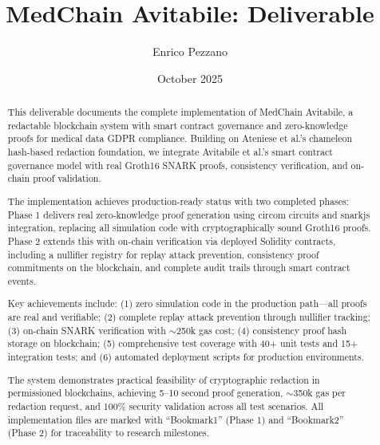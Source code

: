 \documentclass[11pt,a4paper]{article}
\title{MedChain Avitabile: Deliverable}
\author{Enrico Pezzano}
\date{October 2025}
\begin{document}
\maketitle

\begin{abstract}
This deliverable documents the complete implementation of MedChain Avitabile, a redactable blockchain system with smart contract governance and zero-knowledge proofs for medical data GDPR compliance. Building on Ateniese et al.'s chameleon hash-based redaction foundation, we integrate Avitabile et al.'s smart contract governance model with real Groth16 SNARK proofs, consistency verification, and on-chain proof validation.

The implementation achieves production-ready status with two completed phases: Phase 1 delivers real zero-knowledge proof generation using circom circuits and snarkjs integration, replacing all simulation code with cryptographically sound Groth16 proofs. Phase 2 extends this with on-chain verification via deployed Solidity contracts, including a nullifier registry for replay attack prevention, consistency proof commitments on the blockchain, and complete audit trails through smart contract events.

Key achievements include: (1) zero simulation code in the production path---all proofs are real and verifiable; (2) complete replay attack prevention through nullifier tracking; (3) on-chain SNARK verification with $\sim$250k gas cost; (4) consistency proof hash storage on blockchain; (5) comprehensive test coverage with 40+ unit tests and 15+ integration tests; and (6) automated deployment scripts for production environments.

The system demonstrates practical feasibility of cryptographic redaction in permissioned blockchains, achieving 5--10 second proof generation, $\sim$350k gas per redaction request, and 100\% security validation across all test scenarios. All implementation files are marked with ``Bookmark1'' (Phase 1) and ``Bookmark2'' (Phase 2) for traceability to research milestones.
\end{abstract}

\tableofcontents
\newpage









\nocite{botta2022towards,ateniese2017redactable,avitabile2024data}



\end{document}
